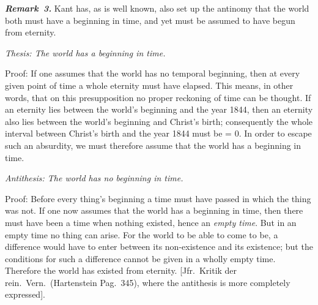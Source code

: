 \documentclass[12pt]{book}
\newcommand{\anm}[1]{\emph{\textbf{Remark~#1.}}}
\begin{document}
\anm{3} Kant has, as is well known, also set up the antinomy that the world
both must have a beginning in time, and yet must be assumed to have begun
from eternity.

\emph{Thesis: The world has a beginning in time.}

Proof: If one assumes that the world has no temporal beginning, then at
every given point of time a whole eternity must have elapsed. This means, in
other words, that on this presupposition no proper reckoning of time can be
thought. If an eternity lies between the world's beginning and the year
1844, then an eternity also lies between the world's beginning and Christ's
birth; consequently the whole interval between Christ's birth and the year
1844 must be = 0. In order to escape such an absurdity, we must therefore
assume that the world has a beginning in time.

\emph{Antithesis: The world has no beginning in time.}

Proof: Before every thing's beginning a time must have passed in which the
thing was not. If one now assumes that the world has a beginning in time,
then there must have been a time when nothing existed, hence an \emph{empty
time}. But in an empty time no thing can arise. For the world to be able to
come to be, a difference would have to enter between its non-existence and
its existence; but the conditions for such a difference cannot be given in a
wholly empty time. Therefore the world has existed from eternity. [Jfr.\
Kritik der rein.\ Vern.\ (Hartenstein Pag.\ 345), where the antithesis is
more completely expressed].
\end{document}
